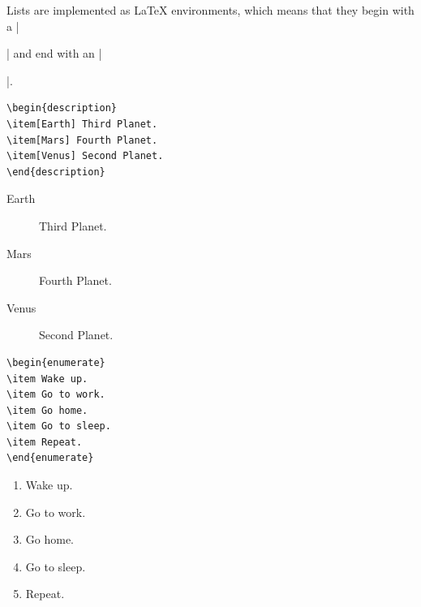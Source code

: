 Lists are implemented as \LaTeX{} environments, which means that they
begin with a |\begin{|\emph{listname}|}| and end with an
|\end{|\emph{listname}|}|.

\begin{minipage}{.45\textwidth}
\begin{Verbatim}
\begin{description}
\item[Earth] Third Planet.
\item[Mars] Fourth Planet.
\item[Venus] Second Planet.
\end{description}
\end{Verbatim}
\end{minipage}
\hfill
\begin{minipage}{.45\textwidth}
\begin{description}
\item[Earth] Third Planet.
\item[Mars] Fourth Planet.
\item[Venus] Second Planet.
\end{description}
\end{minipage}


\begin{minipage}{.45\textwidth}
\begin{Verbatim}
\begin{enumerate}
\item Wake up.
\item Go to work.
\item Go home.
\item Go to sleep.
\item Repeat.
\end{enumerate}
\end{Verbatim}
\end{minipage}
\hfill
\begin{minipage}{.45\textwidth}
\begin{enumerate}
\item Wake up.
\item Go to work.
\item Go home.
\item Go to sleep.
\item Repeat.
\end{enumerate}
\end{minipage}

